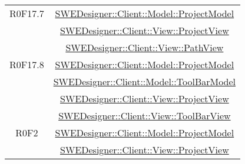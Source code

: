 \documentclass[../DefinizioneDiProdotto.tex]{subfiles}
\begin{document}
\begin{longtable}{|c|c|}
				R0F17.7
				& \hyperlink{SWEDesigner::Client::Model::ProjectModel}{SWEDesigner::Client::Model::ProjectModel}\\
				& \hyperlink{SWEDesigner::Client::View::ProjectView}{SWEDesigner::Client::View::ProjectView}\\
				& \hyperlink{SWEDesigner::Client::View::PathView}{SWEDesigner::Client::View::PathView}\\
				\hline

				R0F17.8
				& \hyperlink{SWEDesigner::Client::Model::ProjectModel}{SWEDesigner::Client::Model::ProjectModel}\\
				& \hyperlink{SWEDesigner::Client::Model::ToolBarModel}{SWEDesigner::Client::Model::ToolBarModel}\\
				& \hyperlink{SWEDesigner::Client::View::ProjectView}{SWEDesigner::Client::View::ProjectView}\\
				& \hyperlink{SWEDesigner::Client::View::ToolBarView}{SWEDesigner::Client::View::ToolBarView}\\
				\hline

				R0F2
				& \hyperlink{SWEDesigner::Client::Model::ProjectModel}{SWEDesigner::Client::Model::ProjectModel}\\
				& \hyperlink{SWEDesigner::Client::View::ProjectView}{SWEDesigner::Client::View::ProjectView}\\
				\hline


\end{longtable}
\end{document}
